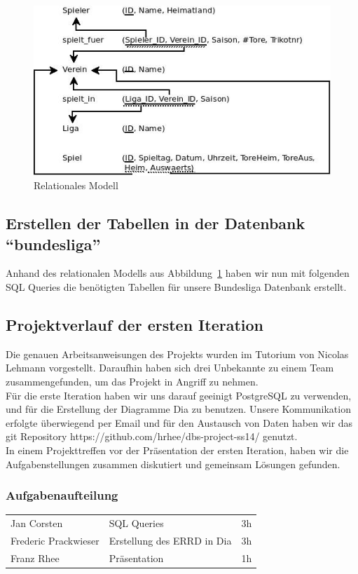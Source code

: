 \documentclass[
10pt,
a4paper
]{scrartcl}
\begin{document}
\begin{figure}[h]
	\centering
  \includegraphics[scale=0.6]{relat.jpg}
	\caption{Relationales Modell }
	\label{fig3}
\end{figure}

\subsection{Erstellen der Tabellen in der Datenbank “bundesliga”}
Anhand des relationalen Modells aus Abbildung~\ref{fig3} haben wir nun mit folgenden SQL Queries die benötigten Tabellen für unsere Bundesliga Datenbank erstellt.
 


\subsection{Projektverlauf der ersten Iteration}

Die genauen Arbeitsanweisungen des Projekts wurden im Tutorium von Nicolas Lehmann vorgestellt. Daraufhin haben sich drei Unbekannte  zu einem Team zusammengefunden, um das Projekt in Angriff zu nehmen.\\
Für die erste Iteration haben wir uns darauf geeinigt PostgreSQL zu verwenden, und für die Erstellung der Diagramme Dia zu benutzen. Unsere Kommunikation erfolgte überwiegend per Email und für den Austausch von Daten haben wir das git  Repository https://github.com/hrhee/dbs-project-ss14/ genutzt.\\
In einem Projekttreffen vor der Präsentation der ersten Iteration, haben wir die Aufgabenstellungen zusammen diskutiert und gemeinsam Lösungen gefunden.

\subsubsection{Aufgabenaufteilung}
\begin{tabular}{ l l c }
Jan Corsten & SQL Queries &  3h \\
Frederic Prackwieser & Erstellung des ERRD in Dia  & 3h \\
Franz Rhee & Präsentation & 1h \\
\end{tabular}
\end{document}

